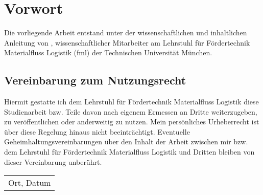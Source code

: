 \chapter*{Vorwort}
\thispagestyle{empty}
Die vorliegende Arbeit entstand unter der wissenschaftlichen und inhaltlichen Anleitung von \Betreuer, wissenschaftlicher Mitarbeiter am Lehrstuhl für Fördertechnik Materialfluss Logistik (fml) der Technischen Universität München. 

\vspace{2cm}
\section*{Vereinbarung zum Nutzungsrecht} 

Hiermit gestatte ich dem Lehrstuhl für Fördertechnik Materialfluss Logistik diese Studienarbeit bzw. Teile davon nach eigenem Ermessen an Dritte weiterzugeben, zu veröffentlichen oder anderweitig zu nutzen. Mein persönliches Urheberrecht ist über diese Regelung hinaus nicht beeinträchtigt. 
Eventuelle Geheimhaltungsvereinbarungen über den Inhalt der Arbeit zwischen mir bzw. dem Lehrstuhl für Fördertechnik Materialfluss Logistik und Dritten bleiben von dieser Vereinbarung unberührt. 

\vspace{2cm}
\begin{tabular}{@{}l@{}}\hline
	Ort, Datum \hspace{1,5cm}
\end{tabular}
